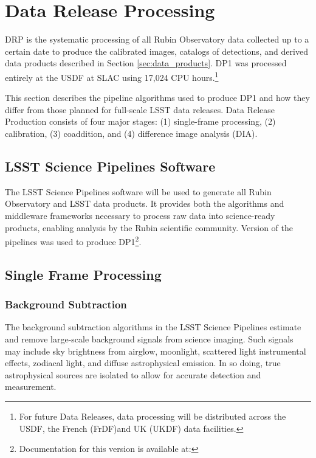 \section{Data Release Processing}
\label{sec:drp}

\gls{DRP} is the systematic processing of all Rubin Observatory data collected up to a certain date to produce the calibrated images, catalogs of detections, and derived data products described in Section \ref{sec:data_products}.
\gls{DP1} was processed entirely at the \gls{USDF} at SLAC using 17,024 CPU hours.\footnote{For future Data Releases, data processing will be distributed across the USDF, the French (FrDF)and UK (UKDF) data facilities.}

This section describes the pipeline algorithms used to produce \gls{DP1} and how they differ from those planned for full-scale LSST data releases.
Data Release Production consists of four major stages: (1) single-frame processing, (2) calibration, (3) coaddition, and (4) difference image analysis (DIA).

\subsection{LSST Science Pipelines Software}
\label{ssec:pipelines}
The  LSST Science Pipelines software \citep{PSTN-019, LDM-151} will be used to generate all Rubin Observatory and LSST data products.
It provides both the \glspl{algorithm} and \gls{middleware} frameworks necessary to process raw data into science-ready products, enabling analysis by the Rubin scientific community.
Version \sciencepipelinesversion of the pipelines was used to produce \gls{DP1}\footnote{Documentation for this version is available at: \sciencepipelinesurl}.

\subsection{Single Frame Processing}
\label{ssec:single_frame_processing}



\subsubsection{Background Subtraction}
\label{ssec:background_subtraction}

The background subtraction algorithms in the LSST Science Pipelines estimate and remove large-scale background signals from science imaging.
Such signals may include sky brightness from airglow, moonlight, scattered light instrumental effects, zodiacal light, and diffuse astrophysical emission.
In so doing, true astrophysical sources are isolated to allow for accurate detection and measurement.

